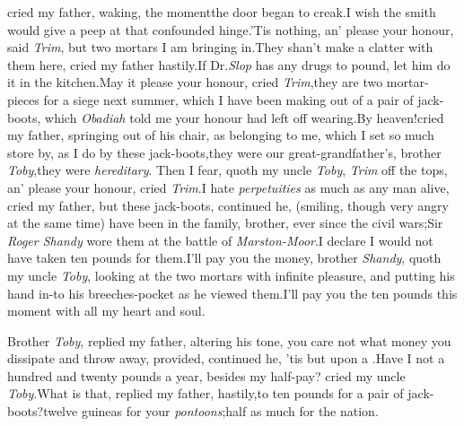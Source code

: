 \documentclass{article}
\begin{document}
\noindent
{}
cried my father, waking, the moment\break the door began to creak.\tsh I wish the
smith would give a peep at that confound\-ed
hinge.\tsh ’Tis nothing, an’ please your honour, said
\textit{Trim}, but two mortars I am bringing in.\tsh They
shan’t make a clatter with them here, cried my father
hastily.\tsh If Dr.\@ \textit{Slop} has any
drugs to pound, let him do it in the\break
kitchen.\tsk May it please
your honour, cried \textit{Trim},\tsk they are two mortar-pieces for
a siege next summer, which I have been making out of a pair of
jack-boots, which \textit{Obadiah} told me your honour had left
off wearing.\tsk By heaven!\@ cried my father, springing out of
his chair, as\break
{} belonging
to me, which I set so much store by, as I do by these
jack-boots,\break\tsh they were our great-grandfather’s, brother
\textit{Toby},\tsk they were \textit{hereditary}.\break
Then I fear, quoth my uncle \textit{Toby}, \textit{Trim}
off the tops, an’ please your honour,\break
cried \textit{Trim}.\tsh I hate \textit{perpetuities} as much\break
as any man alive, cried my father,\break
\tsh but these jack-boots, continued he, (smiling,
though very angry at the same time) have been in the family,
brother, ever since the civil wars;\tsk Sir \textit{Roger
Sha\-ndy} wore them at the battle of \textit{Marston-Moor}.\tsk I
declare I would not have taken ten pounds for them.\tsh I’ll pay
you the money, brother \textit{Shandy}, quoth my uncle
\textit{Toby}, looking at the two mortars with infinite
pleasure, and putting his hand in-\break to his breeches-pocket as he
viewed them.\break\tsh I’ll pay you the ten pounds this moment with all
my heart and soul.\tsh

Brother \textit{Toby}, replied my father, altering his tone, you
care not what money you dissipate and throw away, provided,
continued he, ’tis but upon a
.\tsh Have I not a hundred and
twenty pounds a year, besides my half-pay? cried my uncle
\textit{Toby}.\tsh What is that, replied my father,
hastily,\tsk to ten pounds for a pair of jack-boots?\tsh twelve
guineas for your \textit{pontoons};\tsk half as much
for
\sic\break
{}
the nation.\tsk
\end{document}
